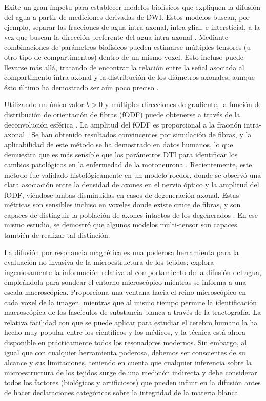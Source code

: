 Exite un gran ímpetu para establecer modelos biofísicos que expliquen la difusión del agua a partir de mediciones derivadas de DWI. Estos modelos buscan, por ejemplo, separar las fracciones de agua  intra-axonal, intra-glial, e intersticial, a la vez que buscan la dirección preferente del agua intra-axonal \cite{panagiotaki2012compartment}.  Mediante combinaciones de parámetros biofísicos pueden estimarse múltiples tensores (u otro tipo de compartimentos) dentro de un mismo voxel. Esto incluso puede llevarse más allá, tratando de encontrar la relación entre la señal asociada al compartimento intra-axonal y la distribución de los diámetros axonales, aunque ésto último ha demostrado ser aún poco preciso \cite{alexander2010orientationally}.

Utilizando un único valor $b>0$  y múltiples direcciones de gradiente, la función de distribución de orientación de fibras (fODF) puede obtenerse a través de la deconvolución esférica \cite{Tournier2004}. La amplitud del fODF es proporcional a la fracción intra-axonal \cite{Raffelt_2012,DellAcqua_2012}. Se han obtenido resultados convincentes por simulación de fibras, y la aplicabilidad de este método se ha demostrado en datos humanos, lo que demuestra que es más sensible que los parámetros DTI para identificar los cambios patológicos en la enfermedad de la motoneurona \cite{Raffelt_2012}. Recientemente, este método fue validado histológicamente en un modelo roedor, donde se observó una clara asociación entre la densidad de axones en el nervio óptico y la amplitud del fODF, viéndose ambas disminuidas en casos de degeneración axonal. Estas métricas son sensibles incluso en voxeles donde existe cruce de fibras, y son capaces de distinguir la población de axones intactos de los degenerados \cite{rojas2019histological}. En ese mismo estudio, se demostró que algunos modelos multi-tensor son capaces también de realizar tal distinción.

La difusión por resonancia magnética es una poderosa herramienta para la evaluación no invasiva de la microestructura de los tejidos; explora ingeniosamente la información relativa al comportamiento de la difusión del agua, empleándola para sondear el entorno microscópico mientras se informa a una escala macroscópica. Proporciona una ventana hacia el reino microscópico en cada voxel de la imagen, mientras que al mismo tiempo permite la identificación  macroscópica de los fascículos de substancia blanca a través de la tractografía. La relativa facilidad con que se puede aplicar para estudiar el cerebro humano la ha hecho muy popular entre los científicos y los médicos, y la técnica está ahora disponible en prácticamente todos los resonadores modernos. Sin embargo, al igual que con cualquier herramienta poderosa, debemos ser conscientes de su alcance y sus limitaciones, teniendo en cuenta que cualquier inferencia sobre la microestructura de los tejidos surge de una medición indirecta y debe considerar todos los factores (biológicos y artificiosos) que pueden influir en la difusión antes de hacer declaraciones categóricas sobre la integridad de la materia blanca.
